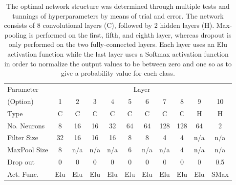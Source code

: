 \documentclass[%
 amsmath,amssymb,
 aps,
 twocolumn,
 prl,
 reprint,
floatfix,
]{revtex4-1}
\begin{document}
\begin{table}[]
\begin{tabular}{lcccccccccc}
\hline
\hline
Parameter & \multicolumn{10}{c}{Layer}\\
\cline{2-11}
(Option) & 1 & 2 & 3 & 4 & 5 & 6 & 7 & 8 & 9 & 10 \\
\hline
Type & C & C & C & C & C & C & C & C & H & H \\
No. Neurons  & 8  & 16  & 16 & 32 & 64 & 64 & 128 & 128 & 64  & 2  \\
Filter Size  & 32 & 16  & 16 & 16 & 8  & 8  & 4   & 4   & n/a & n/a \\
MaxPool Size & 8 & n/a & n/a & n/a & 6 & n/a & n/a & 4 & n/a & n/a \\
Drop out  & 0 & 0 & 0 & 0 & 0 & 0 & 0 & 0 & 0 & 0.5 \\
Act. Func. & Elu & Elu & Elu & Elu & Elu & Elu & Elu & Elu & Elu & SMax \\
\hline
\end{tabular}
\caption{The optimal network structure was determined through multiple tests
and tunnings of hyperparameters by means of trial and error. The network
consists of 8 convolutional layers (C), followed by 2 hidden layers (H).
Max-pooling is performed on the first, fifth, and eighth layer,
whereas dropout is only performed on the two fully-connected layers. Each layer
uses an Elu activation function while the last layer uses a Softmax activation
function in order to normalize the output values to be between zero and one so
as to give a probability value for each class.\label{table:network}}
\end{table}
\end{document}
